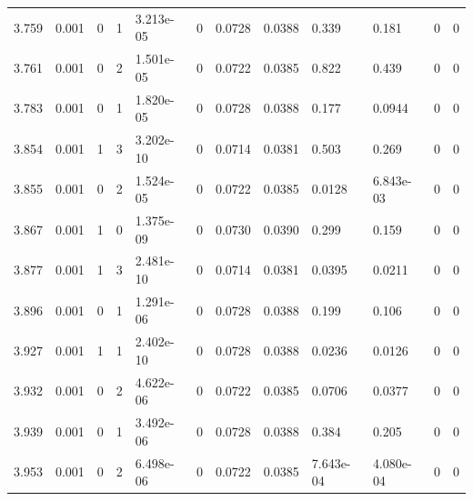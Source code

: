 \documentclass[preview]{standalone}
\begin{document}
{{{{{\begin{tabular}{L{1.2cm}C{1.2cm} C{0.3cm}C{0.5cm} C{1.4cm}C{1.4cm} C{1.4cm}C{1.4cm} C{1.6cm}C{1.6cm} C{1.6cm}C{1.6cm}}
  3.759  &  0.001  & 0     &  1 &  3.213e-05  & 0  &  0.0728&   0.0388& 0.339 & 0.181   &  0 & 0  \\ 
  3.761  &  0.001  & 0     &  2 &  1.501e-05  & 0  &  0.0722&   0.0385& 0.822 & 0.439   &  0 & 0  \\ 
  3.783  &  0.001  & 0     &  1 &  1.820e-05  & 0  &  0.0728&   0.0388& 0.177 & 0.0944   &  0 & 0  \\ 
  3.854  &  0.001  & 1     &  3 &  3.202e-10  & 0  &  0.0714&   0.0381& 0.503 & 0.269   &  0 & 0  \\ 
  3.855  &  0.001  & 0     &  2 &  1.524e-05  & 0  &  0.0722&   0.0385& 0.0128 & 6.843e-03   &  0 & 0  \\ 
  3.867  &  0.001  & 1     &  0 &  1.375e-09  & 0  &  0.0730&   0.0390& 0.299 & 0.159   &  0 & 0  \\ 
  3.877  &  0.001  & 1     &  3 &  2.481e-10  & 0  &  0.0714&   0.0381& 0.0395 & 0.0211   &  0 & 0  \\ 
  3.896  &  0.001  & 0     &  1 &  1.291e-06  & 0  &  0.0728&   0.0388& 0.199 & 0.106   &  0 & 0  \\ 
  3.927  &  0.001  & 1     &  1 &  2.402e-10  & 0  &  0.0728&   0.0388& 0.0236 & 0.0126   &  0 & 0  \\ 
  3.932  &  0.001  & 0     &  2 &  4.622e-06  & 0  &  0.0722&   0.0385& 0.0706 & 0.0377   &  0 & 0  \\ 
  3.939  &  0.001  & 0     &  1 &  3.492e-06  & 0  &  0.0728&   0.0388& 0.384 & 0.205   &  0 & 0  \\ 
  3.953  &  0.001  & 0     &  2 &  6.498e-06  & 0  &  0.0722&   0.0385& 7.643e-04 & 4.080e-04   &  0 & 0  \\ 
\hline 
\end{tabular} 

}}}}}
\end{document}
